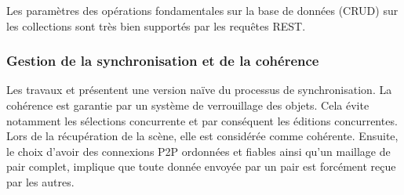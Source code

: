 Les paramètres des opérations fondamentales sur la base de données 
(\gls{CRUD}) sur les collections sont très bien supportés par les requêtes 
\gls{REST}.

\subsubsection{Gestion de la synchronisation et de la cohérence}
\label{sec:synchronisation-client-serveur}

Les travaux \cite{Desprat2015a} et \cite{Desprat2015b} présentent une version 
naïve du processus de synchronisation. La cohérence est garantie par un système 
de verrouillage des objets. Cela évite notamment les sélections concurrente et par 
conséquent les éditions concurrentes. 
Lors de la récupération de la scène, elle est considérée comme cohérente. 
Ensuite, le choix d'avoir des connexions \gls{P2P} ordonnées et fiables ainsi qu'un 
maillage de pair complet, implique que toute donnée envoyée par un pair est 
forcément reçue par les autres. 

